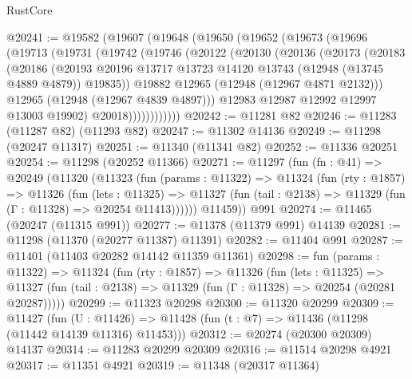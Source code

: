\begin{lexlean}{RustCore}
\begin{coremodule}
@20241 := @19582
    (@19607
      (@19648
        (@19650
          (@19652
            (@19673
              (@19696
                (@19713
                  (@19731
                    (@19742
                      (@19746
                        (@20122
                          (@20130
                            (@20136
                              (@20173
                                (@20183
                                  (@20186
                                    (@20193
                                      @20196
                                      @13717
                                      @13723
                                      @14120
                                      @13743
                                      (@12948 (@13745 @4889 @4879))
                                      @19835))
                                  @19882
                                  @12965
                                  (@12948 (@12967 @4871 @2132)))
                                @12965
                                (@12948 (@12967 @4839 @4897)))
                              @12983
                              @12987
                              @12992
                              @12997
                              @13003
                              @19902)
                            @20018))))))))))))
@20242 := @11281 @82
@20246 := @11283 (@11287 @82) (@11293 @82)
@20247 := @11302 @14136
@20249 := @11298 (@20247 @11317)
@20251 := @11340 (@11341 @82)
@20252 := @11336 @20251
@20254 := @11298 (@20252 @11366)
@20271 := @11297
    (fun (fn : @41) =>
    @20249
      (@11320
        (@11323
          (fun (params : @11322) =>
          @11324
            (fun (rty : @1857) =>
            @11326
              (fun (lets : @11325) =>
              @11327 (fun (tail : @2138) => @11329 (fun (Γ : @11328) => @20254 @11413))))))
        @11459))
    @991
@20274 := @11465 (@20247 (@11315 @991))
@20277 := @11378 (@11379 @991) @14139
@20281 := @11298 (@11370 (@20277 @11387) @11391)
@20282 := @11404 @991
@20287 := @11401 (@11403 @20282 @14142 @11359 @11361)
@20298 := fun (params : @11322) =>
  @11324
    (fun (rty : @1857) =>
    @11326
      (fun (lets : @11325) =>
      @11327 (fun (tail : @2138) => @11329 (fun (Γ : @11328) => @20254 (@20281 @20287)))))
@20299 := @11323 @20298
@20300 := @11320 @20299
@20309 := @11427
    (fun (U : @11426) => @11428 (fun (t : @7) => @11436 (@11298 (@11442 @14139 @11316) @11453)))
@20312 := @20274 (@20300 @20309) @14137
@20314 := @11283 @20299 @20309
@20316 := @11514 @20298 @4921
@20317 := @11351 @4921
@20319 := @11348 (@20317 @11364)

\end{coremodule}
\end{lexlean}
